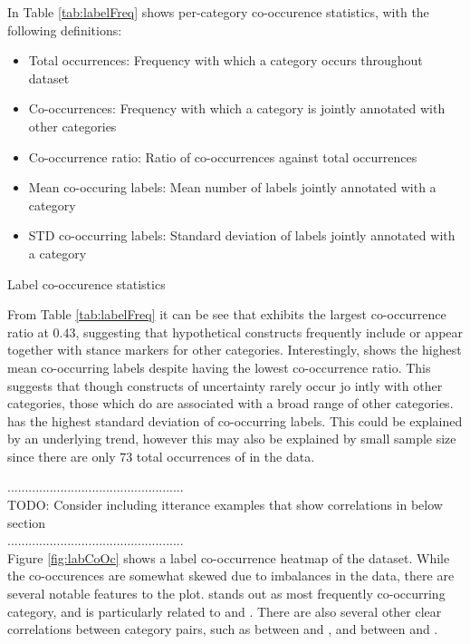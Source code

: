 \documentclass[Dissertation.tex]{subfiles}
\begin{document}
In Table \ref{tab:labelFreq} shows per-category co-occurence statistics, with the following definitions: \begin{itemize}
	\item Total occurrences: Frequency with which a category occurs throughout dataset
	\item Co-occurrences: Frequency with which a category is jointly annotated with other categories
	
	\item Co-occurrence ratio: Ratio of co-occurrences against total occurrences
	\item Mean co-occuring labels: Mean number of labels jointly annotated with a category
	\item  STD co-occurring labels: Standard deviation of labels jointly annotated with a category
\end{itemize}

\begin{table}
	\caption{Label co-occurence statistics}
	\label{tab:labelFreq}
	
	
\end{table}

From Table \ref{tab:labelFreq} it can be see that  exhibits the largest co-occurrence ratio at $ 0.43 $, suggesting that hypothetical constructs frequently include or appear together with stance markers for other categories. Interestingly,  shows the highest mean co-occurring labels despite having the lowest co-occurrence ratio. This suggests that though constructs of uncertainty rarely occur jo	intly with other categories, those which do are associated with a broad range of other categories.  has the highest standard deviation of co-occurring labels. This could be explained by an underlying trend, however this may also be explained by small sample size since there are only $ 73 $ total occurrences of  in the data.

..................................................\\
TODO: Consider including itterance examples that show correlations in below section\\
..................................................\\


Figure \ref{fig:labCoOc} shows a label co-occurrence heatmap of the dataset. While the co-occurences are somewhat skewed due to imbalances in the data, there are several notable features to the plot.  stands out as most frequently co-occurring category,  and is particularly related to  and .	 There are also several other clear correlations between category pairs, such as between  and , and between  and .
\end{document}
